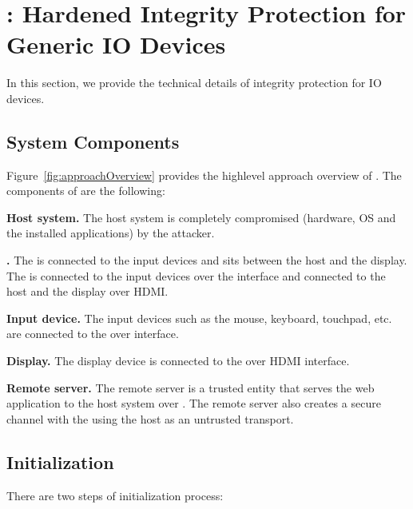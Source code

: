 \section{\name: Hardened Integrity Protection for Generic IO Devices}
\label{sec:systemDesign}


In this section, we provide the technical details of \name integrity protection for IO devices.  

\subsection{System Components}
\label{sec:systemDesign:components}

Figure~\ref{fig:approachOverview} provides the highlevel approach overview of \name. The components of \name are the following:

\begin{mylist}
  \item \textbf{Host system.} The host system is completely compromised (hardware, OS and the installed applications) by the attacker.
  \item \textbf{\device.} The \device is connected to the input devices and sits between the host and the display. The \device is connected to the input devices over the \usb interface and connected to the host and the display over HDMI.
  \item \textbf{Input device.} The input devices such as the mouse, keyboard, touchpad, etc. are connected to the \device over \usb interface.
  \item \textbf{Display.} The display device is connected to the \device over HDMI interface.
  \item \textbf{Remote server.} The remote server is a trusted entity that serves the web application to the host system over \http. The remote server also creates a secure channel with the \device using the host as an untrusted transport. 
  
\end{mylist}

\subsection{Initialization} 
\label{sec:systemDesign:init}

There are two steps of initialization process: 

